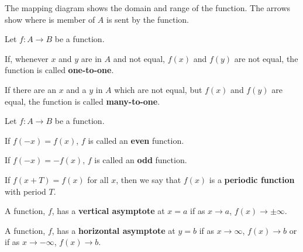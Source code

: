 The mapping diagram shows the domain and range of the function. The arrows show where is member of \(A\) is sent by the function.

\begin{definition}
Let \(f:A\rightarrow B\) be a function.

If, whenever \(x\) and \(y\) are in \(A\) and not equal, \(f(x)\) and \(f(y)\) are not equal, the function is called \textbf{one-to-one}.

If there are an \(x\) and a \(y\) in \(A\) which are not equal, but \(f(x)\) and \(f(y)\) are equal, the function is called \textbf{many-to-one}.
\end{definition}

\begin{definition}
Let \(f:A\rightarrow B\) be a function.

If $f(-x)=f(x)$, $f$ is called an \textbf{even} function.

If $f(-x)=-f(x)$, $f$ is called an \textbf{odd} function.
\end{definition}

\begin{definition}
If $f(x+T)=f(x)$ for all $x$, then we say that $f(x)$ is a \textbf{periodic function} with period $T$.
\end{definition}

\begin{definition}
A function, $f$, has a \textbf{vertical asymptote} at \(x=a\) if as \(x\rightarrow a\), \(f(x)\rightarrow\pm\infty\).

A function, $f$, has a \textbf{horizontal asymptote} at \(y=b\) if as \(x\rightarrow \infty\), \(f(x)\rightarrow b\) or if as \(x\rightarrow -\infty\), \(f(x)\rightarrow b\).
\end{definition}

